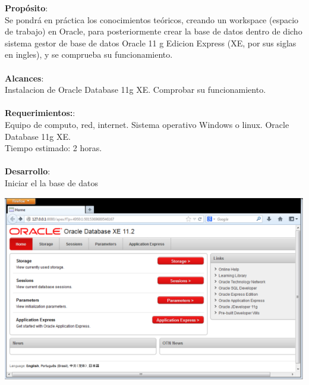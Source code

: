 \documentclass[12pt,letterpaper]{article}
\begin{document}
\textbf{Prop\'osito}:\\
Se pondr\'a en pr\'actica los conocimientos te\'oricos, creando un workspace (espacio
de trabajo) en Oracle, para posteriormente crear la base de datos dentro de dicho
sistema gestor de base de datos Oracle 11 g Edicion Express (XE, por sus siglas en
ingles), y se comprueba su funcionamiento.\\\\
\textbf{Alcances}:\\
Instalacion de Oracle Database 11g XE.
Comprobar su funcionamiento.\\\\
\textbf{Requerimientos:}:\\
Equipo de computo, red, internet.
Sistema operativo Windows o linux.
Oracle Database 11g XE.\\
Tiempo estimado: 2 horas.\\\\
\textbf{Desarrollo}:\\
Iniciar el la base de datos
\begin{center}
\includegraphics[width=15cm]{./IMG/img6}
\end{center}
\end{document}
